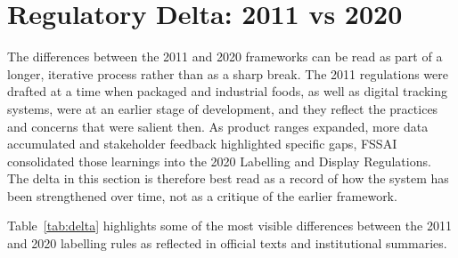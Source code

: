 \documentclass[12pt,a4paper]{article}
\begin{document}
\section{Regulatory Delta: 2011 vs 2020}

The differences between the 2011 and 2020 frameworks can be read as part of a longer, iterative process rather than as a sharp break.
The 2011 regulations were drafted at a time when packaged and industrial foods, as well as digital tracking systems, were at an earlier stage of development, and they reflect the practices and concerns that were salient then.\cite{fssai-2011,frontpack-2011}
As product ranges expanded, more data accumulated and stakeholder feedback highlighted specific gaps, FSSAI consolidated those learnings into the 2020 Labelling and Display Regulations.\cite{fssai-2020-labelling,fssai-comp-labelling}
The delta in this section is therefore best read as a record of how the system has been strengthened over time, not as a critique of the earlier framework.

Table~\ref{tab:delta} highlights some of the most visible differences between the 2011 and 2020 labelling rules as reflected in official texts and institutional summaries.\cite{fssai-2011,fssai-2020-labelling,fssai-faq-2022}
\end{document}
